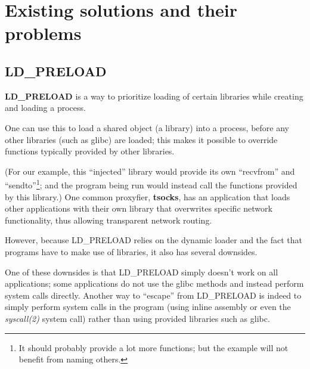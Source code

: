 \documentclass[a4paper, twoside, 10pt, twocolumn]{report}
\begin{document}


%

\section{Existing solutions and their problems}


\subsection{LD\_PRELOAD}

\textbf{LD\_PRELOAD} is a way to prioritize loading of certain libraries
while creating and loading a process.

One can use this to load a shared object (a library) into a process,
before any other libraries (such as glibc) are loaded;
this makes it possible to override functions typically provided by other
libraries.

(For our example, this ``injected'' library would provide its own
``recvfrom'' and ``sendto''\footnote{It should probably provide
a lot more functions; but the example will not benefit from naming others.};
and the program being run
would instead call the functions provided by this library.) One common
proxyfier, \textbf{tsocks}, has an application that loads other applications
with their own library that overwrites specific network functionality,
thus allowing transparent network routing.

However, because LD\_PRELOAD relies on the dynamic loader and the fact that
programs have to make use of libraries, it also has several downsides.

One of these downsides is that LD\_PRELOAD simply doesn't work on all
applications; some applications do not use the glibc methods and instead
perform system calls directly. Another way to ``escape'' from LD\_PRELOAD
is indeed to simply perform system calls in the program (using inline assembly
or even the \textit{syscall(2)} system call) rather than using
provided libraries such as glibc.
\end{document}

